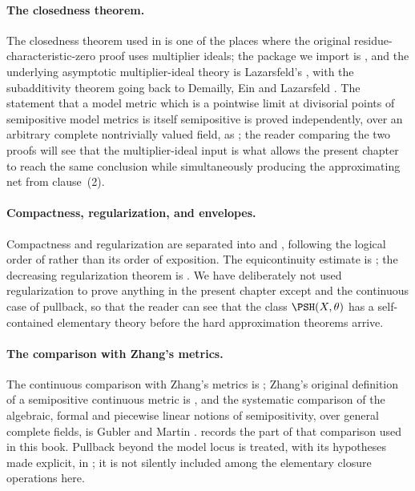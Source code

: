 \paragraph{The closedness theorem.}
The closedness theorem used in
 is one of the places where the original
residue-characteristic-zero proof uses multiplier ideals; the package we
import is \cite[Appendix~B]{BFJ16}, and the underlying asymptotic
multiplier-ideal theory is Lazarsfeld's \cite[Chapter~11]{PAG2}, with the
subadditivity theorem going back to Demailly, Ein and Lazarsfeld
\cite{DEL00}.  The statement that a model metric which is a pointwise limit
at divisorial points of semipositive model metrics is itself semipositive is
proved independently, over an arbitrary complete nontrivially valued field,
as ; the reader comparing the two proofs
will see that the multiplier-ideal input is what allows the present chapter
to reach the same conclusion while simultaneously producing the
approximating net from clause~(2).

\paragraph{Compactness, regularization, and envelopes.}
Compactness and
regularization are separated into  and
, following the logical order of
\cite[Sections~6--8]{BFJ16} rather than its order of exposition.  The
equicontinuity estimate  is
\cite[Theorem~6.1]{BFJ16}; the decreasing regularization theorem
 is \cite[Theorem~8.7]{BFJ16}.  We
have deliberately not used regularization to prove anything in the present
chapter except  and the continuous case of
pullback, so that the reader can see that the class $\PSH(X,\theta)$ has a
self-contained elementary theory before the hard approximation theorems
arrive.

\paragraph{The comparison with Zhang's metrics.}
The continuous comparison with Zhang's metrics
is \cite[Corollary~8.8]{BFJ16}; Zhang's original definition of a
semipositive continuous metric is \cite{Zhang1995}, and the systematic
comparison of the algebraic, formal and piecewise linear notions of
semipositivity, over general complete fields, is Gubler and Martin
\cite{GM19}.   records the part of that
comparison used in this book.  Pullback beyond the model locus is treated,
with its hypotheses made explicit, in ; it is
not silently included among the elementary closure operations here.

